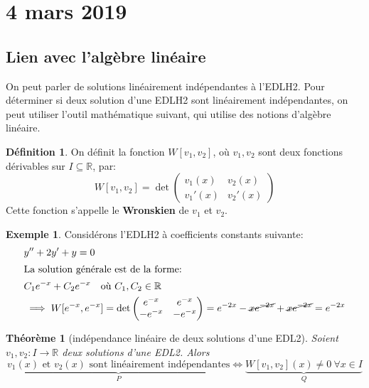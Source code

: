 \documentclass{report}
\theoremstyle{plain}
\newtheorem{thm}{Théorème}[section]
\theoremstyle{definition}
\newtheorem{defn}{Définition}[section]
\newtheorem{exmp}{Exemple}[section]
\theoremstyle{remark}
\begin{document}
\section{4 mars 2019}

\subsection{Lien avec l'algèbre linéaire}
On peut parler de solutions linéairement indépendantes à l'EDLH2. Pour déterminer si deux solution d'une EDLH2 sont linéairement indépendantes, on peut utiliser l'outil mathématique suivant, qui utilise des notions d'algèbre linéaire.
\begin{defn}
On définit la fonction $W[v_1, v_2]$, où $v_1, v_2$ sont deux fonctions dérivables sur $I \subseteq \mathbb R$, par:
	\begin{equation}
		W[v_1, v_2] = \det \begin{pmatrix}
			v_1(x) & v_2(x) \\
			v_1'(x) & v_2'(x)
		\end{pmatrix}
	\end{equation}
	Cette fonction s'appelle le \textbf{Wronskien} de $v_1$ et $v_2$.
\end{defn}

\begin{exmp}
Considérons l'EDLH2 à coefficients constants suivante:
	\begin{align*}
		&y'' + 2y' + y = 0 \\
	\intertext{La solution générale est de la forme:}
		&C_1 e^{-x} + C_2 e^{-x} \quad \text{où } C_1, C_2 \in \mathbb R \\
		&\implies W[e^{-x}, e^{-x}] = \det \begin{pmatrix}
			e^{-x} & e^{-x} \\
			-e^{-x} & -e^{-x}
			\end{pmatrix} = e^{-2x} - \cancel{xe^{-2x}} + \cancel{xe^{-2x}} = e^{-2x}
	\end{align*}
\end{exmp}

\begin{thm}[indépendance linéaire de deux solutions d'une EDL2]
	Soient $v_1, v_2 : I \to \mathbb R$ deux solutions d'une EDL2. Alors
	\begin{equation}
		\underbrace{v_1(x) \text{ et } v_2(x) \text{ sont linéairement indépendantes}}_{P} \iff \underbrace{W[v_1, v_2](x) \neq 0 \ \forall x \in I}_{Q}
	\end{equation}
\end{thm}
\end{document}
